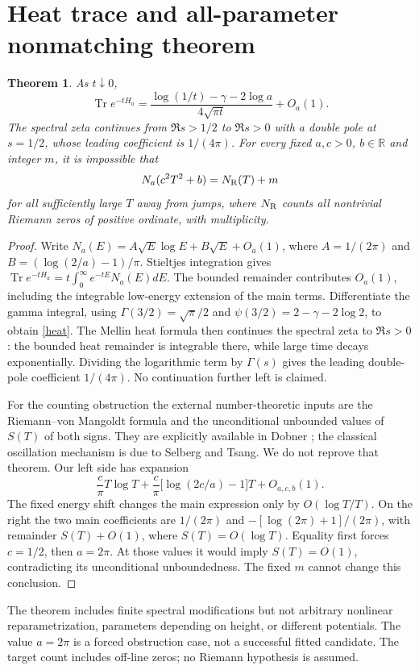 \documentclass[10pt]{article}
\newtheorem{theorem}{Theorem}
\newcommand{\Tr}{\operatorname{Tr}}
\begin{document}
\section{Heat trace and all-parameter nonmatching theorem}
\begin{theorem}
As $t\downarrow0$,
\begin{equation}\label{heat}
 \Tr e^{-tH_a}=
 \frac{\log(1/t)-\gamma-2\log a}{4\sqrt{\pi t}}+O_a(1).
\end{equation}
The spectral zeta continues from $\Re s>1/2$ to $\Re s>0$ with a
double pole at $s=1/2$, whose leading coefficient is $1/(4\pi)$.
For every fixed $a,c>0$, $b\in\mathbb R$ and integer $m$, it is
impossible that
\begin{equation}\label{no-go}
 N_a(c^2T^2+b)=N_{\rm R}(T)+m
\end{equation}
for all sufficiently large $T$ away from jumps, where $N_{\rm R}$ counts
all nontrivial Riemann zeros of positive ordinate, with multiplicity.
\end{theorem}
\begin{proof}
Write $N_a(E)=A\sqrt E\log E+B\sqrt E+O_a(1)$,
where $A=1/(2\pi)$ and $B=(\log(2/a)-1)/\pi$.
Stieltjes integration gives
$\Tr e^{-tH_a}=t\int_0^\infty e^{-tE}N_a(E)dE$.
The bounded remainder contributes $O_a(1)$, including the integrable
low-energy extension of the main terms. Differentiate the gamma integral,
using $\Gamma(3/2)=\sqrt\pi/2$ and
$\psi(3/2)=2-\gamma-2\log2$, to obtain \eqref{heat}.
The Mellin heat formula then continues the spectral zeta to $\Re s>0$:
the bounded heat remainder is integrable there, while large time decays
exponentially. Dividing the logarithmic term by $\Gamma(s)$ gives
the leading double-pole coefficient $1/(4\pi)$. No continuation further
left is claimed.

For the counting obstruction the external number-theoretic inputs are
the Riemann--von Mangoldt formula and the unconditional unbounded values
of $S(T)$ of both signs. They are explicitly available in Dobner
\cite[equation (1), Theorem 1]{dobner}; the classical oscillation mechanism
is due to Selberg and Tsang. We do not reprove that theorem.
Our left side has expansion
\[
 \frac c\pi T\log T+
 \frac c\pi\bigl[\log(2c/a)-1\bigr]T+O_{a,c,b}(1).
\]
The fixed energy shift changes the main expression only by
$O(\log T/T)$. On the right the two main coefficients are
$1/(2\pi)$ and $-[\log(2\pi)+1]/(2\pi)$, with remainder
$S(T)+O(1)$, where $S(T)=O(\log T)$.
Equality first forces $c=1/2$, then $a=2\pi$.
At those values it would imply $S(T)=O(1)$, contradicting its
unconditional unboundedness. The fixed $m$ cannot change this conclusion.
\end{proof}
The theorem includes finite spectral modifications but not arbitrary
nonlinear reparametrization, parameters depending on height, or different
potentials. The value $a=2\pi$ is a forced obstruction case, not a
successful fitted candidate. The target count includes off-line zeros;
no Riemann hypothesis is assumed.
\fi
\end{document}
